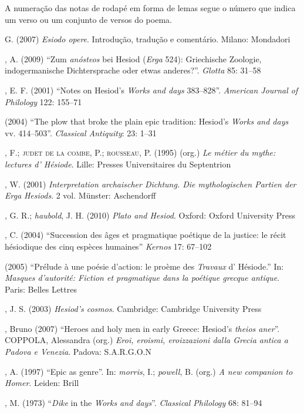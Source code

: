 A numeração das notas de rodapé em forma de lemas segue o número que 
indica um verso ou um conjunto de versos do poema.


\begin{bibliohedra}
 G. (2007) \textit{Esiodo opere}. Introdução, tradução e
comentário. Milano: Mondadori
  
, A. (2009) “Zum \textit{anósteos} bei Hesiod (\textit{Erga}
524): Griechische Zoologie, indogermanische Dichtersprache oder etwas
anderes?”. \textit{Glotta} 85: 31--58
  
, E. F. (2001) “Notes on Hesiod’s \textit{Works and days} 383--828”.
\textit{American Journal of Philology} 122: 155--71
  
\titidem (2004) “The plow that broke the plain epic tradition: Hesiod’s
\textit{Works and days} vv. 414--503”. \textit{Classical Antiquity}: 23:
1--31
  
, F.; \textsc{judet de la combe}, P.; \textsc{rousseau}, P. (1995) (org.) \textit{Le
métier du mythe: lectures d’ Hésiode}. Lille: Presses Universitaires du
Septentrion
  
, W. (2001) \textit{Interpretation archaischer Dichtung. Die
mythologischen Partien der Erga} \textit{Hesiods}. 2 vol. Münster:
Aschendorff
  
, G. R.; \textit{haubold}, J. H. (2010) \textit{Plato and Hesiod}.
Oxford: Oxford University Press
  
, C. (2004) “Succession des âges et pragmatique poétique de la
justice: le récit hésiodique des cinq espèces humaines” \textit{Kernos}
17: 67--102

\titidem (2005) “Prélude à une poésie d’action: le proème des
\textit{Travaux} d’ Hésiode.” In: \textit{Masques d’autorité: Fiction
et pragmatique dans la poétique grecque antique}. Paris: Belles Lettres
  
, J. S. (2003) \textit{Hesiod’s cosmos}. Cambridge: Cambridge
University Press
  
, Bruno (2007) “Heroes and holy men in early Greece:
Hesiod's \textit{theios aner}”. COPPOLA, Alessandra
(org.) \textit{Eroi, eroismi, eroizzazioni dalla Grecia antica a Padova
e Venezia}. Padova: S.A.R.G.O.N
  
, A. (1997) “Epic as genre”. In: \textit{morris}, I.; \textit{powell}, B. (org.)
\textit{A new companion to Homer}. Leiden: Brill
  
, M. (1973) “\textit{Dike} in the \textit{Works and days}”.
\textit{Classical Philology} 68: 81--94
  

\end{bibliohedra}
